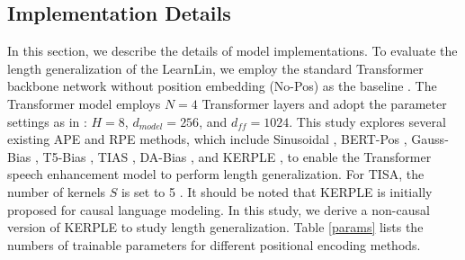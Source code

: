 \documentclass[journal]{IEEEtran}
\begin{document}
\subsection{Implementation Details}\label{sec:4.2}
In this section, we describe the details of model implementations. To evaluate the length generalization of the LearnLin, we employ the standard Transformer backbone network without position embedding (No-Pos) as the baseline \cite{mhanet}. The Transformer model employs $N\!=\!4$ Transformer layers \cite{ripple} and adopt the parameter settings as in \cite{tfaj}: $H\!=\!8$, $d_{model}\!=\!256$, and $d_{f\!f}\!=\!1024$. This study explores several existing APE and RPE methods, which include Sinusoidal \cite{attention2017}, BERT-Pos \cite{bert}, Gauss-Bias \cite{gaussbias}, T5-Bias \cite{T5}, TIAS \cite{tisa}, DA-Bias \cite{DA}, and KERPLE \cite{kerple}, to enable the Transformer speech enhancement model to perform length generalization. For TISA, the number of kernels $S$ is set to 5 \cite{tisa}. It should be noted that KERPLE is initially proposed for causal language modeling. In this study, we derive a non-causal version of KERPLE to study length generalization. Table \ref{params} lists the numbers of trainable parameters for different positional encoding methods. 



\end{document}
